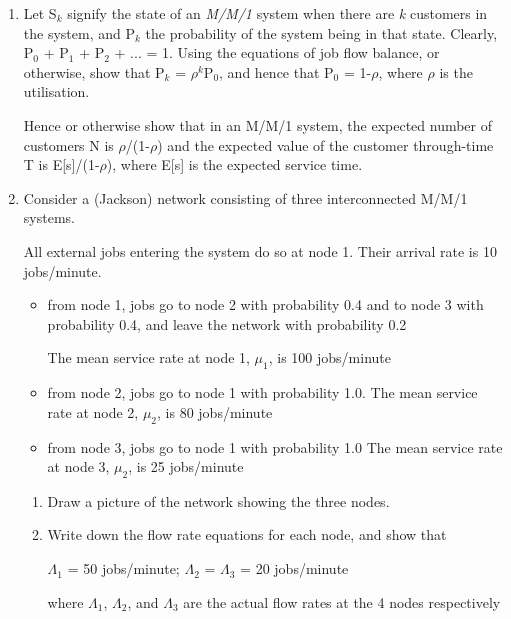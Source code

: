 \begin{enumerate}

\item  Let S$_k$ signify the state of an {\em M/M/1} system when
there are {\em k} customers in the system,
and P$_k$ the probability of the system being in that state.
Clearly, P$_0$ + P$_1$ + P$_2$ + ... = 1.
Using the equations of job flow balance,
or otherwise, show that P$_k$ = $\rho^k$P$_0$,
and hence that P$_0$ = 1-$\rho$, where $\rho$ is the utilisation.

Hence or otherwise show that in an M/M/1 system,
the expected number of customers N is  $\rho$/(1-$\rho$) and 
the expected value of the customer through-time T is
E[s]/(1-$\rho$), where E[s] is the expected service time.


\item  Consider a (Jackson) network consisting of three 
interconnected M/M/1 systems.

All external jobs entering the system do so at node 1.
Their arrival rate is 10 jobs/minute.

\begin{itemize}
\item from node 1, jobs go to node 2 with probability 0.4 
and to node 3 with probability 0.4,
and leave the network with probability 0.2 

The mean service rate at node 1, $\mu_1$, is 100 jobs/minute

\item from node 2, jobs go to node 1 with probability 1.0.
The mean service rate at node 2, $\mu_2$, is 80 jobs/minute


\item from node 3, jobs go to node 1 with probability 1.0
The mean service rate at node 3, $\mu_2$, is 25 jobs/minute
\end{itemize}


\begin{enumerate}
\item Draw a picture of the network showing the three nodes.

\item Write down the flow rate equations for each node,
and show that 
\begin{center}
$\Lambda_1$ = 50 jobs/minute; $\Lambda_2$ =  $\Lambda_3$ = 20 jobs/minute
\end{center}

where $\Lambda_1$, $\Lambda_2$, and $\Lambda_3$
are the actual flow rates at the 4 nodes respectively


\end{enumerate}
\end{enumerate}
